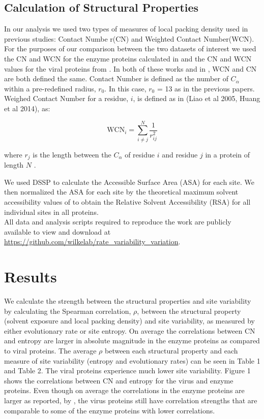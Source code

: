 \documentclass[12pt]{article}
\begin{document}
    \subsection*{Calculation of Structural Properties}
In our analysis we used two types of measures of local packing density used in previous studies: Contact Numbe r(CN) and Weighted Contact Number(WCN). For the purposes of our comparison between the two datasets of interest we used the CN and WCN for the enzyme proteins calculated in \cite{Huangetal2014} and the CN and WCN values for the viral proteins from \cite{Shahmoradietal2014}. In both of these works and in \cite{Yehetal2014}, WCN and CN are both defined the same.  Contact Number is defined as the number of $C_{\alpha}$ within a pre-redefined radius, $r_0$. In this case, $r_0$ = 13 as in the previous papers. Weighed Contact Number for a residue, $i$, is defined as in (Liao et al 2005, Huang et al 2014), as:
	
	\begin{equation} \label{wcn_eqn}
		\text{WCN}_i = \sum_{i \neq j}^{N} \frac{1}{r_{ij}^2 } 
	\end{equation}
	
	where $r_j$ is the length between the $C_{\alpha}$ of residue $i$ and residue $j$ in a protein of length $N$ \citep{Yehetal2014}. 

\indent We used DSSP \citep{Kabschetal2005} to calculate the Accessible Surface Area (ASA) for each site. We then normalized the ASA for each site by the theoretical maximum solvent accessibility values of \cite{Tienetal2013} to obtain the Relative Solvent Accessibility (RSA) for all individual sites in all proteins. \\

All data and analysis scripts required to reproduce the work are publicly available to view and download at \url{https://github.com/wilkelab/rate_variability_variation}.

\section{Results}
\label{sec:results}

We calculate the strength between the structural properties and site variability by calculating the Spearman correlation, $\rho$,  between the structural property (solvent exposure and local packing density) and site variability, as measured by either evolutionary rate or site entropy. On average the correlations between CN and entropy are larger in absolute magnitude in the enzyme proteins as compared to viral proteins. The average $\rho$ between each structural property and each measure of site variability (entropy and evolutionary rates) can be seen in {\color{red}Table 1 and Table 2}. The viral proteins experience much lower site variability. Figure 1 shows the correlations between CN and entropy for the virus and enzyme proteins. Even though on average the correlations in the enzyme proteins are larger as reported, by \cite{Yehetal2014}, the virus proteins still have correlation strengths that are comparable to some of the enzyme proteins with lower correlations. 
\end{document}
